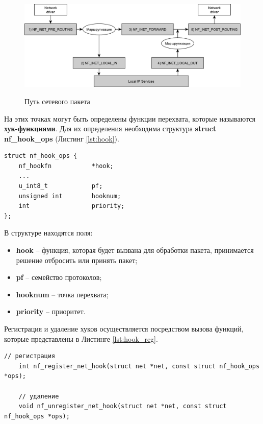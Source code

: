 \begin{figure}[h]
	\centering
	\begin{center}
		{\includegraphics[scale=0.6]{img/packets.pdf}}
		\caption{Путь сетевого пакета}
		\label{fig2:image}
	\end{center}
\end{figure}

\newpage

На этих точках могут быть определены функции перехвата, которые называются \textbf{хук-функциями}. Для их определения необходима структура \textbf{struct nf\_hook\_ops} (Листинг \ref{lst:hook}).

\begin{lstlisting}[caption = {struct nf\_hook\_ops}, label=lst:hook]
struct nf_hook_ops {
	nf_hookfn			*hook;
	...
	u_int8_t			pf;
	unsigned int		hooknum;
	int					priority;
};
\end{lstlisting}

В структуре находятся поля:
\begin{itemize}
	\item \textbf{hook} -- функция, которая будет вызвана для обработки пакета, принимается решение отбросить или принять пакет;
	
	\item \textbf{pf} -- семейство протоколов;
	
	\item \textbf{hooknum} -- точка перехвата;
	
	\item \textbf{priority} -- приоритет. \\
\end{itemize}

Регистрация и удаление хуков осуществляется посредством вызова функций, которые представлены в Листинге \ref{lst:hook_reg}.

\begin{lstlisting}[caption = {Функции для регистрации и удаления хук-функций}, label=lst:hook_reg]
	// регистрация
	int nf_register_net_hook(struct net *net, const struct nf_hook_ops *ops);
	
	// удаление
	void nf_unregister_net_hook(struct net *net, const struct nf_hook_ops *ops);
\end{lstlisting}

